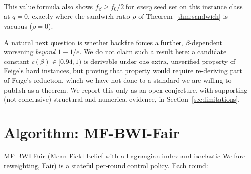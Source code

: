\documentclass[journal]{IEEEtran}
\begin{document}
This value formula also shows $f_\beta\ge f_0/2$ for \emph{every} seed set
on this instance class at $q=0$, exactly where the sandwich ratio $\rho$ of
Theorem~\ref{thm:sandwich} is vacuous ($\rho=0$).

A natural next question is whether backfire forces a further,
$\beta$-dependent worsening \emph{beyond} $1-1/e$. We do not claim such a
result here: a candidate constant $c(\beta)\in[0.94,1)$ is derivable under
one extra, unverified property of Feige's hard instances, but proving that
property would require re-deriving part of Feige's reduction, which we
have not done to a standard we are willing to publish as a theorem. We
report this only as an open conjecture, with supporting (not conclusive)
structural and numerical evidence, in
Section~\ref{sec:limitations}.

\section{Algorithm: MF-BWI-Fair}
\label{sec:algorithm}

MF-BWI-Fair (Mean-Field Belief with a Lagrangian index and isoelastic-Welfare
reweighting, Fair) is a stateful per-round control policy. Each round:
\end{document}
